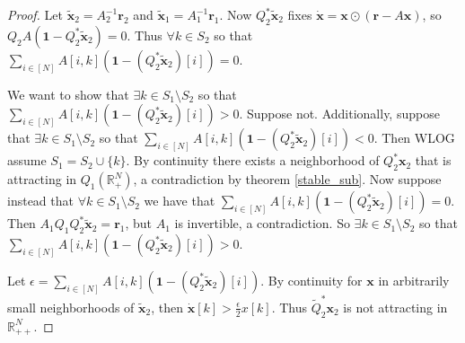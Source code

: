 \documentclass{article}
\newcommand{\R}{\mathbb{R}}
\newcommand{\eps}{\epsilon}
\newcommand{\1}{\mathbf{1}}
\newcommand{\0}{\mathbf{0}}
\newcommand{\x}{{\mathbf {{x}}}}
\newcommand{\cp}{{\mathbf {{r}}}}
\begin{document}
\begin{proof}
Let $\tilde \x_2 = A_2^{-1} \cp_2$ and $\tilde \x_1 = A_1^{-1} \cp_1$. 
Now $Q_2^* \tilde \x_2$ fixes $\dot{\x} = \x \odot (\cp - A \x)$, so $Q_2 A (\1 - Q_2^* \tilde \x_2) = 0$.
Thus $\forall k \in S_2$ so that $\sum_{i \in [N]} A[i, k] (\1 - (Q_2^*\tilde \x_2) [i]) = 0$.

We want to show that $\exists k \in S_1 \setminus S_2$ so that $\sum_{i \in [N]} A[i, k] (\1 - (Q_2^*\tilde \x_2) [i]) > 0$. 
Suppose not.  Additionally, suppose that $\exists k \in S_1 \setminus S_2$ so that $\sum_{i \in [N]} A[i, k] (\1 - (Q_2^*\tilde \x_2) [i]) < 0$.
Then WLOG assume $S_1 = S_2 \cup \{k\}$.
By continuity there exists a neighborhood of $Q_2^* \x_2$ that is attracting in $Q_1(\R_+^N)$, a contradiction by theorem \ref{stable_sub}.
Now suppose instead that $\forall k \in S_1 \setminus S_2$ we have that $\sum_{i \in [N]} A[i, k] (\1 - (Q_2^*\tilde \x_2) [i]) = 0$.
Then $A_1 Q_1Q_2^* \tilde \x_2 = \cp_1$, but $A_1$ is invertible, a contradiction.
So $\exists k \in S_1 \setminus S_2$ so that $\sum_{i \in [N]} A[i, k] (\1 - (Q_2^*\tilde \x_2) [i]) > 0$. 

Let $\eps = \sum_{i \in [N]} A[i, k] (\1 - (Q_2^*\tilde \x_2) [i])$.  By continuity for $\x$ in arbitrarily small neighborhoods of $\tilde \x_2$, then $\dot \x [k] > \frac{\eps}{2} x[k]$.  Thus $\tilde Q_2^*\x_2$ is not attracting in $\R_{++}^N$.
\end{proof}





 
\end{document}
